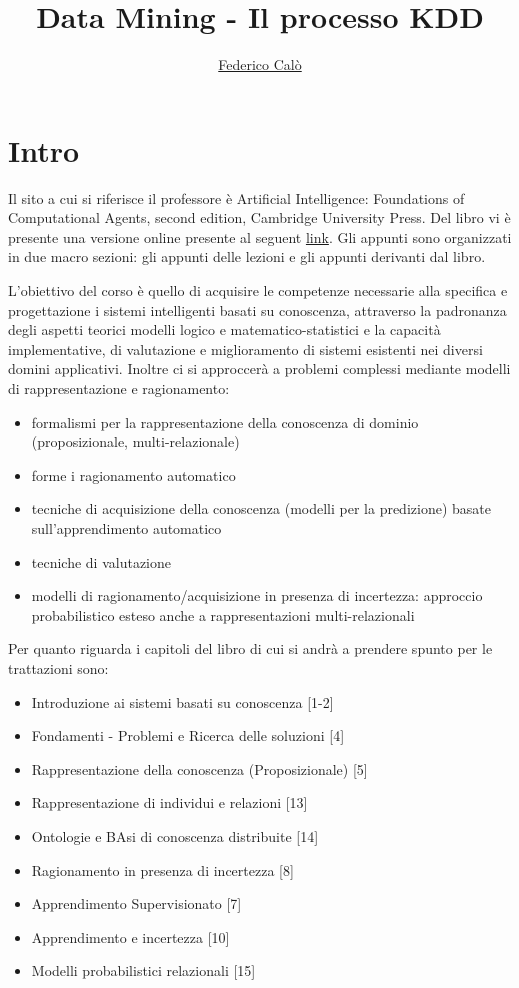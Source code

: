 \documentclass[a4paper]{extarticle}
\title{Data Mining - Il processo KDD}
\author{\href{http://www.federicocalo.it}{Federico Calò} }
\date{}
\begin{document}
\maketitle
\newpage
\tableofcontents
\voffset -30pt

\newpage

\section*{Intro}

 Il sito a cui si riferisce il professore è Artificial Intelligence: Foundations of Computational Agents, second edition, Cambridge University Press. Del libro vi è presente una versione online presente al seguent \href{https://artint.info/}{link}. Gli appunti sono organizzati in due macro sezioni: gli appunti delle lezioni e gli appunti derivanti dal libro. 

L'obiettivo del corso è quello di acquisire le competenze necessarie alla specifica e progettazione i sistemi intelligenti basati su conoscenza, attraverso la padronanza degli aspetti teorici modelli logico e matematico-statistici e la capacità implementative, di valutazione e miglioramento di sistemi esistenti nei diversi domini applicativi. Inoltre ci si approccerà a problemi complessi mediante modelli di rappresentazione e ragionamento:
 
 \begin{itemize}
 	\item formalismi per la rappresentazione della conoscenza di dominio (proposizionale, multi-relazionale)
 	\item forme i ragionamento automatico
 	\item tecniche di acquisizione della conoscenza (modelli per la predizione) basate sull'apprendimento automatico
 	\item tecniche di valutazione
 	\item modelli di ragionamento/acquisizione in presenza di incertezza: approccio probabilistico esteso anche a rappresentazioni multi-relazionali
 \end{itemize}
 
Per quanto riguarda i capitoli del libro di cui si andrà a prendere spunto per le trattazioni sono:

\begin{itemize}
	\item Introduzione ai sistemi basati su conoscenza [1-2]
	\item Fondamenti - Problemi e Ricerca delle soluzioni [4]
	\item Rappresentazione della conoscenza (Proposizionale) [5]
	\item Rappresentazione di individui e relazioni [13]
	\item Ontologie e BAsi di conoscenza distribuite [14]
	\item Ragionamento in presenza di incertezza [8]
	\item Apprendimento Supervisionato [7]
	\item Apprendimento e incertezza [10]
	\item Modelli probabilistici relazionali [15]
\end{itemize}
 
\end{document}
